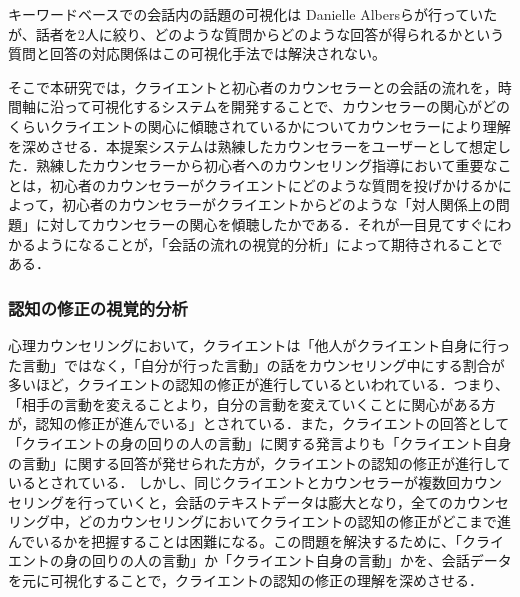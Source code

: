 \documentclass[shuuron]{kuee}
\begin{document}
キーワードベースでの会話内の話題の可視化は Danielle Albersら\cite{angus2012conceptual}が行っていたが、話者を2人に絞り、どのような質問からどのような回答が得られるかという質問と回答の対応関係はこの可視化手法では解決されない。

そこで本研究では，クライエントと初心者のカウンセラーとの会話の流れを，時間軸に沿って可視化するシステムを開発することで、カウンセラーの関心がどのくらいクライエントの関心に傾聴されているかについてカウンセラーにより理解を深めさせる．本提案システムは熟練したカウンセラーをユーザーとして想定した．熟練したカウンセラーから初心者へのカウンセリング指導において重要なことは，初心者のカウンセラーがクライエントにどのような質問を投げかけるかによって，初心者のカウンセラーがクライエントからどのような「対人関係上の問題」に対してカウンセラーの関心を傾聴したかである．それが一目見てすぐにわかるようになることが，「会話の流れの視覚的分析」によって期待されることである．%






\subsubsection{認知の修正の視覚的分析}


心理カウンセリングにおいて，クライエントは「他人がクライエント自身に行った言動」ではなく，「自分が行った言動」の話をカウンセリング中にする割合が多いほど，クライエントの認知の修正が進行しているといわれている．つまり、「相手の言動を変えることより，自分の言動を変えていくことに関心がある方が，認知の修正が進んでいる」\cite{zokad}とされている．また，クライエントの回答として「クライエントの身の回りの人の言動」に関する発言よりも「クライエント自身の言動」に関する回答が発せられた方が，クライエントの認知の修正が進行しているとされている．
しかし、同じクライエントとカウンセラーが複数回カウンセリングを行っていくと，会話のテキストデータは膨大となり，全てのカウンセリング中，どのカウンセリングにおいてクライエントの認知の修正がどこまで進んでいるかを把握することは困難になる。この問題を解決するために、「クライエントの身の回りの人の言動」か「クライエント自身の言動」かを、会話データを元に可視化することで，クライエントの認知の修正の理解を深めさせる．
\end{document}
